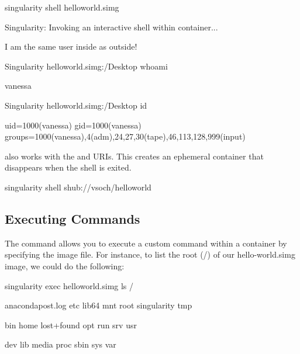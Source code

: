 \documentclass[letterpaper,10pt,english]{sphinxmanual}
\begin{document}
%
\begin{sphinxVerbatim}[commandchars=\\\{\}]
\PYGZdl{} singularity shell hello\PYGZhy{}world.simg

Singularity: Invoking an interactive shell within container...


\PYGZsh{} I am the same user inside as outside!

Singularity hello\PYGZhy{}world.simg:\PYGZti{}/Desktop\PYGZgt{} whoami

vanessa


Singularity hello\PYGZhy{}world.simg:\PYGZti{}/Desktop\PYGZgt{} id

uid=1000(vanessa) gid=1000(vanessa) groups=1000(vanessa),4(adm),24,27,30(tape),46,113,128,999(input)
\end{sphinxVerbatim}

 also works with the  and  URIs. This creates an ephemeral container that
disappears when the shell is exited.

%
\begin{sphinxVerbatim}[commandchars=\\\{\}]
\PYGZdl{} singularity shell shub://vsoch/hello\PYGZhy{}world
\end{sphinxVerbatim}


\subsection{Executing Commands}
\label{\detokenize{quick_start:executing-commands}}
The  command allows you to execute a custom command within a container by
specifying the image file. For instance, to list the root (/) of our
hello-world.simg image, we could do the following:

%
\begin{sphinxVerbatim}[commandchars=\\\{\}]
\PYGZdl{} singularity exec hello\PYGZhy{}world.simg ls /

anaconda\PYGZhy{}post.log  etc   lib64       mnt   root  singularity  tmp

bin        home  lost+found  opt   run   srv          usr

dev        lib   media       proc  sbin  sys          var
\end{sphinxVerbatim}
\end{document}
